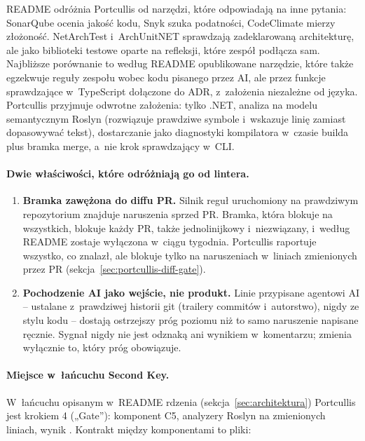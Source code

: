 README odróżnia Portcullis od narzędzi, które odpowiadają na inne pytania: SonarQube
ocenia jakość kodu, Snyk szuka podatności, CodeClimate mierzy złożoność. NetArchTest
i~ArchUnitNET sprawdzają zadeklarowaną architekturę, ale jako biblioteki testowe oparte na
refleksji, które zespół podłącza sam. Najbliższe porównanie to według README opublikowane
narzędzie, które także egzekwuje reguły zespołu wobec kodu pisanego przez AI, ale przez
funkcje sprawdzające w~TypeScript dołączone do ADR, z~założenia niezależne od języka.
Portcullis przyjmuje odwrotne założenia: tylko .NET, analiza na modelu semantycznym Roslyn
(rozwiązuje prawdziwe symbole i~wskazuje linię zamiast dopasowywać tekst), dostarczanie jako
diagnostyki kompilatora w~czasie builda plus bramka merge, a~nie krok sprawdzający w~CLI.

\paragraph{Dwie właściwości, które odróżniają go od lintera.}
\begin{enumerate}[leftmargin=*]
  \item \textbf{Bramka zawężona do diffu PR.} Silnik reguł uruchomiony na prawdziwym
        repozytorium znajduje naruszenia sprzed PR. Bramka, która blokuje na wszystkich,
        blokuje każdy PR, także jednolinijkowy i~niezwiązany, i~według README zostaje
        wyłączona w~ciągu tygodnia. Portcullis raportuje wszystko, co znalazł, ale blokuje
        tylko na naruszeniach w~liniach zmienionych przez PR
        (sekcja~\ref{sec:portcullis-diff-gate}).
  \item \textbf{Pochodzenie AI jako wejście, nie produkt.} Linie przypisane agentowi AI
        -- ustalane z~prawdziwej historii git (trailery commitów i~autorstwo), nigdy ze
        stylu kodu -- dostają ostrzejszy próg poziomu niż to samo naruszenie napisane
        ręcznie. Sygnał nigdy nie jest odznaką ani wynikiem w~komentarzu; zmienia wyłącznie
        to, który próg obowiązuje.
\end{enumerate}

\paragraph{Miejsce w~łańcuchu Second Key.} W~łańcuchu opisanym w~README rdzenia
(sekcja~\ref{sec:architektura}) Portcullis jest krokiem 4 („Gate”): komponent C5, analyzery
Roslyn na zmienionych liniach, wynik . Kontrakt między komponentami to
pliki:

